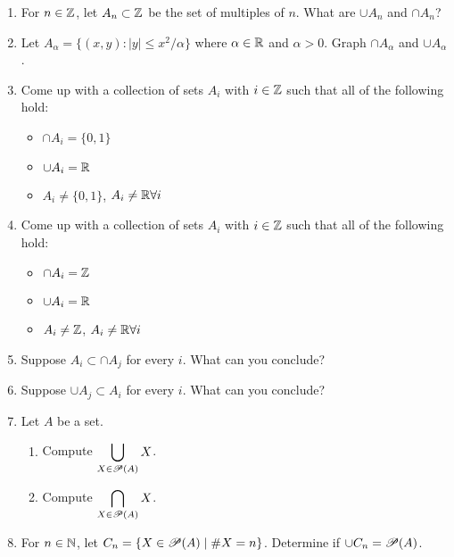 \begin{enumerate}
    \item For $n \in \mathbb{Z}$, let $A_n \subset \mathbb{Z}$ be the set of multiples of $n$. What are $\cup A_n$ and $\cap A_n$?

    \item Let $A_\alpha = \{(x,y): |y| \leq x^2/\alpha\}$ where $\alpha \in \mathbb{R}$ and $\alpha > 0$. Graph $\cap A_\alpha$ and $\cup A_\alpha$.

    \item Come up with a collection of sets $A_i$ with $i \in \mathbb{Z}$ such that all of the following hold:
  \begin{itemize}
      \item $\cap A_i = \{0, 1\}$
      \item $\cup A_i = \mathbb{R}$
      \item $A_i \neq \{0, 1\}$, $A_i \neq \mathbb{R} \forall i$
  \end{itemize}

    \item Come up with a collection of sets $A_i$ with $i \in \mathbb{Z}$ such that all of the following hold:
  \begin{itemize}
      \item $\cap A_i = \mathbb{Z}$
      \item $\cup A_i = \mathbb{R}$
      \item $A_i \neq \mathbb{Z}$, $A_i \neq \mathbb{R} \forall i$
  \end{itemize}

    \item Suppose $A_i \subset \cap A_j$ for every $i$. What can you conclude?

    \item Suppose $\cup A_j \subset A_i$ for every $i$. What can you conclude?

    \item Let $A$ be a set. 
  \begin{enumerate}
      \item Compute $\displaystyle\bigcup_{X \in \mathscr{P}(A)} X$. 
      \item Compute $\displaystyle\bigcap_{X \in \mathscr{P}(A)} X$.
  \end{enumerate}

    \item For $n \in \mathbb{N}$, let $C_n = \{X \in \mathscr{P}(A) \mid \# X = n\}$. Determine if $\cup C_n = \mathscr{P}(A)$.


\end{enumerate}
